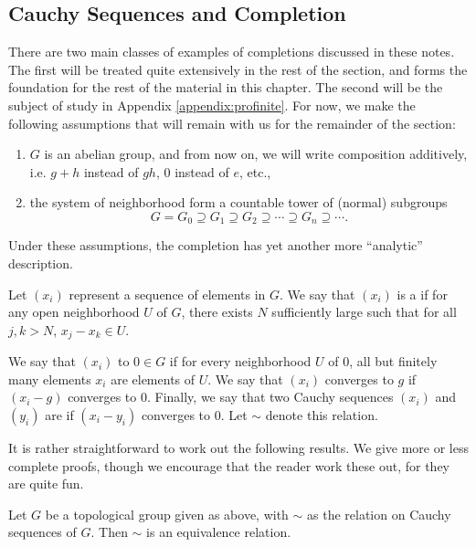 \subsection{Cauchy Sequences and Completion}

There are two main classes of examples of completions discussed in 
these notes. The first will be treated quite extensively in the 
rest of the section, and forms the foundation for the rest of the 
material in this chapter. The second will be the subject of study 
in Appendix \ref{appendix:profinite}. For now, we make the 
following assumptions that will remain with us for the remainder 
of the section:

\begin{enumerate}
\item $G$ is an abelian group, and from now on, we will write
composition additively, i.e. $g + h$ instead of $gh$, $0$ instead
of $e$, etc.,

\item the system of neighborhood form a countable tower of (normal)
subgroups
\[
G = G_0 \supseteq G_1 \supseteq G_2 \supseteq \cdots \supseteq G_n 
\supseteq \cdots.
\]

\end{enumerate}

Under these assumptions, the completion has yet another more 
``analytic'' description.

\begin{defn}
Let $(x_i)$ represent a sequence of elements in $G$. We say that
$(x_i)$ is a  if for
any open neighborhood $U$ of $G$, there exists $N$ sufficiently
large such that for all $j, k > N$, $x_j - x_k \in U$.

We say that $(x_i)$  
to $0 \in G$ if for every neighborhood $U$ of $0$, all but 
finitely many elements $x_i$ are elements of $U$. We say that
$(x_i)$ converges to $g$ if $(x_i - g)$ converges to $0$.
Finally, we say that two Cauchy sequences $(x_i)$ and $(y_i)$ are 
 if $(x_i - y_i)$
converges to $0$. Let $\sim$ denote this relation.
\end{defn}

It is rather straightforward to work out the following results.
We give more or less complete proofs, though we encourage that the 
reader work these out, for they are quite fun.

\begin{prop}
Let $G$ be a topological group given as above, with $\sim$ as the
relation on Cauchy sequences of $G$. Then $\sim$ is an equivalence 
relation.
\end{prop}

